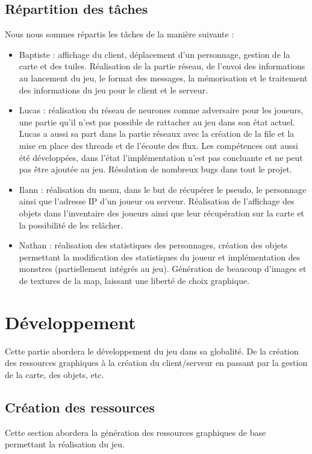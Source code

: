 \documentclass[11pt]{article}
\begin{document}
        \subsection{Répartition des tâches}


        Nous nous sommes répartis les tâches de la manière suivante :
        \begin{itemize}
            \item Baptiste : affichage du client, déplacement d’un personnage, gestion de la carte et des tuiles. Réalisation de la partie réseau, de l’envoi des informations au lancement du jeu, le format des messages, la mémorisation et le traitement des informations du jeu pour le client et le serveur.       
            \item Lucas : réalisation du réseau de neurones comme adversaire pour les joueurs, une partie qu'il n’est pas possible de rattacher au jeu dans son état actuel. Lucas a aussi sa part dans la partie réseaux avec la création de la file et la mise en place des threads et de l’écoute des flux. Les compétences ont aussi été développées, dans l’état l’implémentation n’est pas concluante et ne peut pas être ajoutée au jeu. Résolution de nombreux bugs dans tout le projet. 
            \item Ilann : réalisation du menu, dans le but de récupérer le pseudo, le personnage ainsi que l'adresse IP d’un joueur ou serveur. Réalisation de l’affichage des objets dans l’inventaire des joueurs ainsi que leur récupération sur la carte et la possibilité de les relâcher.  
            \item Nathan : réalisation des statistiques des personnages, création des objets permettant la modification des statistiques du joueur et implémentation des monstres (partiellement intégrés au jeu). Génération de beaucoup d'images et de textures de la map, laissant une liberté de choix graphique.
        \end{itemize}
    \section{Développement}
    Cette partie abordera le développement du jeu dans sa globalité. De la création des ressources graphiques à la création du client/serveur en passant par la gestion de la carte, des objets, etc. 
        \subsection{Création des ressources}
        Cette section abordera la génération des ressources graphiques de base permettant la réalisation du jeu.
\end{document}
